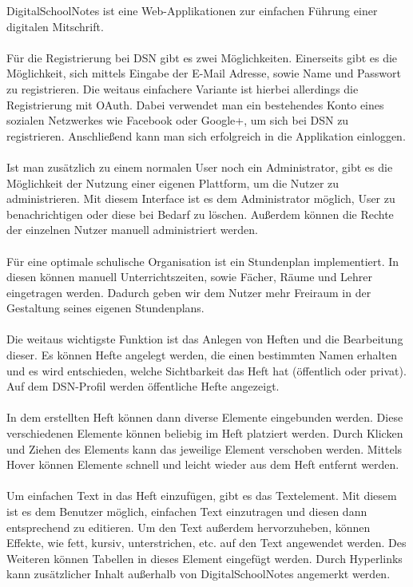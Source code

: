 DigitalSchoolNotes ist eine Web-Applikationen zur einfachen Führung einer digitalen Mitschrift.\\\\
Für die Registrierung bei DSN gibt es zwei Möglichkeiten. Einerseits gibt es die Möglichkeit, sich mittels Eingabe der E-Mail Adresse, sowie Name und Passwort zu registrieren. Die weitaus einfachere Variante ist hierbei allerdings die Registrierung mit OAuth. Dabei verwendet man ein bestehendes Konto eines sozialen Netzwerkes wie Facebook oder Google+, um sich bei DSN zu registrieren. Anschließend kann man sich erfolgreich in die Applikation einloggen.\\
\\
Ist man zusätzlich zu einem normalen User noch ein Administrator, gibt es die Möglichkeit der Nutzung einer eigenen Plattform, um die Nutzer zu administrieren. Mit diesem Interface ist es dem Administrator möglich, User zu benachrichtigen oder diese bei Bedarf zu löschen. Außerdem können die Rechte der einzelnen Nutzer manuell administriert werden.\\
\\
Für eine optimale schulische Organisation ist ein Stundenplan implementiert. In diesen können manuell Unterrichtszeiten, sowie Fächer, Räume und Lehrer eingetragen werden. Dadurch geben wir dem Nutzer mehr Freiraum in der Gestaltung seines eigenen Stundenplans.\\
\\
Die weitaus wichtigste Funktion ist das Anlegen von Heften und die Bearbeitung dieser. Es können Hefte angelegt werden, die einen bestimmten Namen erhalten und es wird entschieden, welche Sichtbarkeit das Heft hat (öffentlich oder privat). Auf dem DSN-Profil werden öffentliche Hefte angezeigt.\\
\\
In dem erstellten Heft können dann diverse Elemente eingebunden werden. Diese verschiedenen Elemente können beliebig im Heft platziert werden. Durch Klicken und Ziehen des Elements kann das jeweilige Element verschoben werden. Mittels Hover können Elemente schnell und leicht wieder aus dem Heft entfernt werden.\\
\\
Um einfachen Text in das Heft einzufügen, gibt es das Textelement. Mit diesem ist es dem Benutzer möglich, einfachen Text einzutragen und diesen dann entsprechend zu editieren. Um den Text außerdem hervorzuheben, können Effekte, wie fett, kursiv, unterstrichen, etc. auf den Text angewendet werden. Des Weiteren können Tabellen in dieses Element eingefügt werden. Durch Hyperlinks kann zusätzlicher Inhalt außerhalb von DigitalSchoolNotes angemerkt werden.\\
